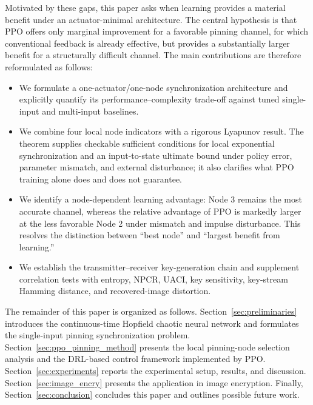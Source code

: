 \documentclass[10pt,twocolumn]{article}
\newcommand{\rev}[1]{{\color{revisionblue}#1}}
\theoremstyle{definition}
\begin{document}
\rev{Motivated by these gaps, this paper asks when learning provides a material benefit under an actuator-minimal architecture. The central hypothesis is that PPO offers only marginal improvement for a favorable pinning channel, for which conventional feedback is already effective, but provides a substantially larger benefit for a structurally difficult channel. The main contributions are therefore reformulated as follows:}
\begin{itemize}
	\item \rev{We formulate a one-actuator/one-node synchronization architecture and explicitly quantify its performance--complexity trade-off against tuned single-input and multi-input baselines.}

\item \rev{We combine four local node indicators with a rigorous Lyapunov result. The theorem supplies checkable sufficient conditions for local exponential synchronization and an input-to-state ultimate bound under policy error, parameter mismatch, and external disturbance; it also clarifies what PPO training alone does and does not guarantee.}

\item \rev{We identify a node-dependent learning advantage: Node 3 remains the most accurate channel, whereas the relative advantage of PPO is markedly larger at the less favorable Node 2 under mismatch and impulse disturbance. This resolves the distinction between ``best node'' and ``largest benefit from learning.''}

\item \rev{We establish the transmitter--receiver key-generation chain and supplement correlation tests with entropy, NPCR, UACI, key sensitivity, key-stream Hamming distance, and recovered-image distortion.}
\end{itemize}

The remainder of this paper is organized as follows. Section~\ref{sec:preliminaries} introduces the continuous-time Hopfield chaotic neural network and formulates the single-input pinning synchronization problem. Section~\ref{sec:ppo_pinning_method} presents the local pinning-node selection analysis and the DRL-based control framework implemented by PPO. Section~\ref{sec:experiments} reports the experimental setup, results, and discussion. Section~\ref{sec:image_encry} presents the application in image encryption. Finally, Section~\ref{sec:conclusion} concludes this paper and outlines possible future work.
\end{document}

